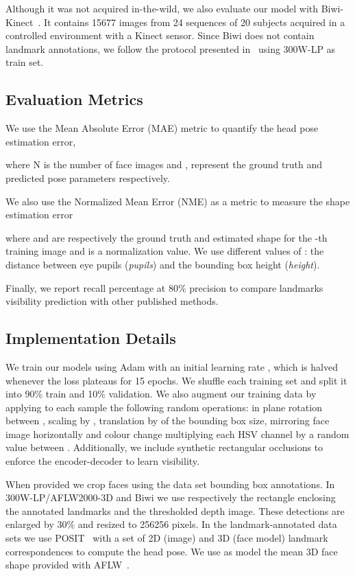 \documentclass[9pt,technote,compsoc]{IEEEtran}
\begin{document}
Although it was not acquired in-the-wild, we also evaluate our model with
Biwi-Kinect~\cite{Fanelli13}. It contains 15677 images from 24 sequences of 20 subjects
acquired in a controlled environment with a Kinect sensor.
Since Biwi does not contain landmark annotations, we follow the protocol presented in~\cite{Ruiz18} using 300W-LP as train set.


\subsection{Evaluation Metrics}
We use the Mean Absolute Error (\textrm{MAE}) metric to quantify the head pose estimation error,

where N is the number of face images and ,  represent the ground truth and predicted pose parameters respectively. 

We also use the Normalized Mean Error (\textrm{NME}) as a metric to measure the shape estimation error

where  and  are respectively the ground truth and estimated shape for the -th training image and  is a normalization value. We use different values of : the distance between eye pupils (\emph{pupils}) and the bounding box height (\emph{height}). 

Finally, we report recall percentage at 80\% precision to compare landmarks visibility prediction with other published methods.

\subsection{Implementation Details}
\label{sec:implementation}

We train our models using Adam with an initial learning rate , which is halved whenever the loss plateaus for 15 epochs.
We shuffle each training set and split it into 90\% train and 10\% validation.
We also augment our training data by applying to each sample the following random operations: in plane rotation between , scaling by , translation by  of the bounding box size, mirroring face image horizontally and colour change multiplying each HSV channel by a random value between . Additionally, we include synthetic rectangular occlusions to enforce the encoder-decoder to learn visibility.


When provided we crop faces using the data set bounding box annotations. In 300W-LP/AFLW2000-3D and Biwi we use respectively the rectangle enclosing the annotated landmarks and the thresholded depth image. These detections are enlarged by 30\% and resized to 256256 pixels.
In the landmark-annotated data sets we use POSIT~\cite{DeMenthon95} with a set of 2D (image) and 3D (face model) landmark correspondences to compute the head pose. We use as model the mean 3D face shape provided with AFLW~\cite{Koestinger11}. 
\end{document}
